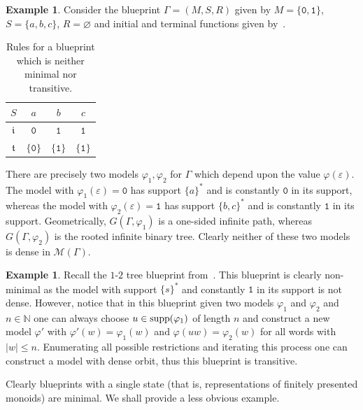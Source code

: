 \documentclass{article}
\theoremstyle{definition}
\newtheorem{example}[theorem]{Example} %
\theoremstyle{definition}
\newcommand{\N}{\mathbb{N}}
\newcommand{\M}{\mathcal{M}}
\newcommand{\init}{\mathfrak{i}}
\newcommand{\ter}{\mathfrak{t}}
\newcommand{\supp}{\textnormal{supp}}
\begin{document}
\begin{example}
    Consider the blueprint $\Gamma =(M,S,R)$ given by $M = \{\texttt{0},\texttt{1}\}$, $S = \{a,b,c\}$, $R = \varnothing$ and initial and terminal functions given by~.
    \begin{table}[ht!]
			\centering
			\begin{tabular}{|c||c|c|c|}
				\hline
				$S$ & $a$ & $b$ & $c$\\
				\hline
				$\init$ & $\texttt{0}$ & $\texttt{1}$ & $\texttt{1}$ \\
				\hline
				$\ter$ & $\{\texttt{0}\}$ & $\{\texttt{1}\}$ & $\{\texttt{1}\}$\\
				\hline
			\end{tabular}
   \caption{Rules for a blueprint which is neither minimal nor transitive.}
        \label{table:rules_for_boring_example}
		\end{table} 

There are precisely two models $\varphi_1,\varphi_2$ for $\Gamma$ which depend upon the value $\varphi(\varepsilon)$. The model with $\varphi_1(\varepsilon)=\texttt{0}$ has support $\{a\}^*$ and is constantly $\texttt{0}$ in its support, whereas the model with $\varphi_2(\varepsilon)=\texttt{1}$ has support $\{b,c\}^*$ and is constantly $\texttt{1}$ in its support. Geometrically, $G(\Gamma, \varphi_1)$ is a one-sided infinite path, whereas $G(\Gamma, \varphi_2)$ is the rooted infinite binary tree. Clearly neither of these two models is dense in $\M(\Gamma)$.
\end{example}

\begin{example}
    Recall the $1$-$2$ tree blueprint from~. This blueprint is clearly non-minimal as the model with support $\{s\}^*$ and constantly $\texttt{1}$ in its support is not dense. However, notice that in this blueprint given two models $\varphi_1$ and $\varphi_2$ and $n \in \N$ one can always choose $u \in \supp(\varphi_1)$ of length $n$ and construct a new model $\varphi'$ with $\varphi'(w) = \varphi_1(w)$ and $\varphi(uw) = \varphi_2(w)$ for all words with $|w| \leq n$. Enumerating all possible restrictions and iterating this process one can construct a model with dense orbit, thus this blueprint is transitive.
\end{example}

Clearly blueprints with a single state (that is, representations of finitely presented monoids) are minimal. We shall provide a less obvious example.
\end{document}
